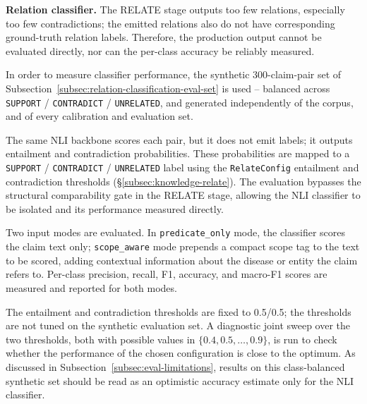 \medskip{}

\textbf{Relation classifier.} The RELATE stage outputs too few relations, especially too few contradictions; the emitted relations also do not have corresponding ground-truth relation labels. Therefore, the production output cannot be evaluated directly, nor can the per-class accuracy be reliably measured. 

In order to measure classifier performance, the synthetic 300-claim-pair set of Subsection~\ref{subsec:relation-classification-eval-set} is used -- balanced across \texttt{SUPPORT} / \texttt{CONTRADICT} / \texttt{UNRELATED}, and generated independently of the corpus, and of every calibration and evaluation set. 

The same NLI backbone scores each pair, but it does not emit labels; it outputs entailment and contradiction probabilities. These probabilities are mapped to a \texttt{SUPPORT} / \texttt{CONTRADICT} / \texttt{UNRELATED} label using the \texttt{RelateConfig} entailment and contradiction thresholds (§\ref{subsec:knowledge-relate}). The evaluation bypasses the structural comparability gate in the RELATE stage, allowing the NLI classifier to be isolated and its performance measured directly.

Two input modes are evaluated. In \texttt{predicate\_only} mode, the classifier scores the claim text only; \texttt{scope\_aware} mode prepends a compact scope tag to the text to be scored, adding contextual information about the disease or entity the claim refers to. Per-class precision, recall, F1, accuracy, and macro-F1 scores are measured and reported for both modes.

The entailment and contradiction thresholds are fixed to 0.5/0.5; the thresholds are not tuned on the synthetic evaluation set. A diagnostic joint sweep over the two thresholds, both with possible values in $\{0.4, 0.5, \dots, 0.9\}$, is run to check whether the performance of the chosen configuration is close to the optimum. As discussed in Subsection~\ref{subsec:eval-limitations}, results on this class-balanced synthetic set should be read as an optimistic accuracy estimate only for the NLI classifier.
